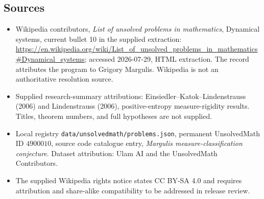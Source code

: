 \documentclass[11pt]{article}
\begin{document}
\subsection{Sources}
\begin{itemize}
\item Wikipedia contributors, \emph{List of unsolved problems in mathematics}, Dynamical systems, current bullet 10 in the supplied extraction: \url{https://en.wikipedia.org/wiki/List_of_unsolved_problems_in_mathematics#Dynamical_systems}; accessed 2026-07-29, HTML extraction. The record attributes the program to Grigory Margulis. Wikipedia is not an authoritative resolution source.
\item Supplied research-summary attributions: Einsiedler--Katok--Lindenstrauss (2006) and Lindenstrauss (2006), positive-entropy measure-rigidity results. Titles, theorem numbers, and full hypotheses are not supplied.
\item Local registry \texttt{data/unsolvedmath/problems.json}, permanent UnsolvedMath ID $4900010$, source code catalogue entry, \emph{Margulis measure-classification conjecture}. Dataset attribution: Ulam AI and the UnsolvedMath Contributors.
\item The supplied Wikipedia rights notice states CC BY-SA 4.0 and requires attribution and share-alike compatibility to be addressed in release review.
\end{itemize}
\end{document}
